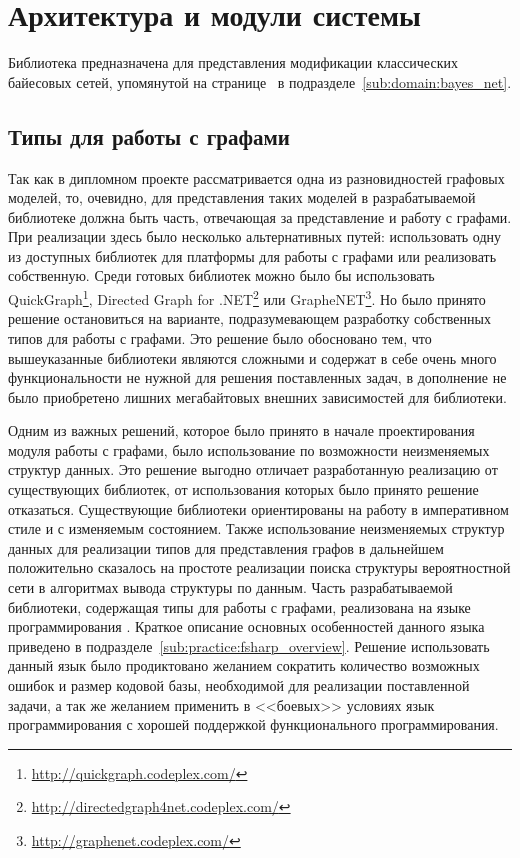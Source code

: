 \section{Архитектура и модули системы} %
\label{sec:arch_and_mod}

Библиотека предназначена для представления модификации классических байесовых сетей, упомянутой на странице~\pageref{page:domain:bayes_mod} в подразделе~\ref{sub:domain:bayes_net}.

\subsection{Типы для работы с графами}
\label{sub:arch_and_mod:graphlib}

Так как в дипломном проекте рассматривается одна из разновидностей графовых моделей, то, очевидно, для представления таких моделей в разрабатываемой библиотеке должна быть часть, отвечающая за представление и работу с графами.
При реализации здесь было несколько альтернативных путей: использовать одну из доступных библиотек для платформы \dotnet{} для работы с графами или реализовать собственную.
Среди готовых библиотек можно было бы использовать QuickGraph\footnote{\url{http://quickgraph.codeplex.com/}}, Directed Graph for .NET\footnote{\url{http://directedgraph4net.codeplex.com/}} или GrapheNET\footnote{\url{http://graphenet.codeplex.com/}}.
Но было принято решение остановиться на варианте, подразумевающем разработку собственных типов для работы с графами.
Это решение было обосновано тем, что вышеуказанные библиотеки являются сложными и содержат в себе очень много функциональности не нужной для решения поставленных задач, в дополнение не было приобретено лишних мегабайтовых внешних зависимостей для библиотеки.

Одним из важных решений, которое было принято в начале проектирования модуля работы с графами, было использование по возможности неизменяемых структур данных.
Это решение выгодно отличает разработанную реализацию от существующих библиотек, от использования которых было принято решение отказаться.
Существующие библиотеки ориентированы на работу в императивном стиле и с изменяемым состоянием.
Также использование неизменяемых структур данных для реализации типов для представления графов в дальнейшем положительно сказалось на простоте реализации поиска структуры вероятностной сети в алгоритмах вывода структуры по данным.
Часть разрабатываемой библиотеки, содержащая типы для работы с графами, реализована на языке программирования \fsharp{}.
Краткое описание основных особенностей данного языка приведено в подразделе~\ref{sub:practice:fsharp_overview}.
Решение использовать данный язык было продиктовано желанием сократить количество возможных ошибок и размер кодовой базы, необходимой для реализации поставленной задачи, а так же желанием применить в <<боевых>> условиях язык программирования с хорошей поддержкой функционального программирования.

